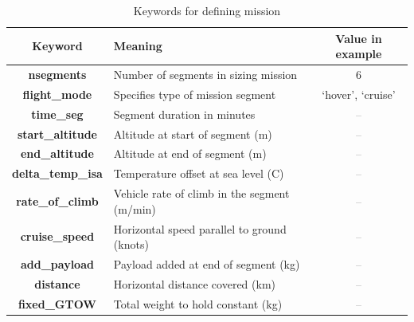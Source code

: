 \begin{center}
  \begin{table}[H]
	\caption{Keywords for defining mission}
	\label{tbl:mission_keywords}
    \begin{tabular}{| c | l | c |}
    \hline
    Keyword & Meaning & Value in example \\ 
    \hline
\textbf{nsegments} & Number of segments in sizing mission & 6 \\
\textbf{flight\_mode} & Specifies type of mission segment & `hover', `cruise' \\
\textbf{time\_seg} & Segment duration in minutes & \textcolor{gray}{--} \\
\textbf{start\_altitude} & Altitude at start of segment (m) & \textcolor{gray}{--} \\
\textbf{end\_altitude} & Altitude at end of segment (m) & \textcolor{gray}{--} \\
\textbf{delta\_temp\_isa} & Temperature offset at sea level (C) & \textcolor{gray}{--} \\
\textbf{rate\_of\_climb} & Vehicle rate of climb in the segment (m/min) & \textcolor{gray}{--} \\
\textbf{cruise\_speed} & Horizontal speed parallel to ground (knots) & \textcolor{gray}{--} \\
\textbf{add\_payload} & Payload added at end of segment (kg) & \textcolor{gray}{--} \\
\textbf{distance} & Horizontal distance covered (km) & \textcolor{gray}{--} \\
\textbf{fixed\_GTOW} & Total weight to hold constant (kg) & \textcolor{gray}{--} \\
     \hline
  \end{tabular}
\end{table}
\end{center}

